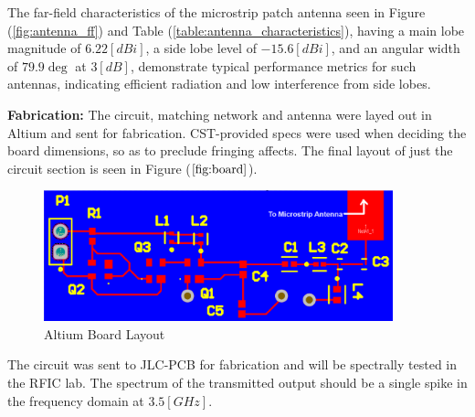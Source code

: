 The far-field characteristics of the microstrip patch antenna seen in Figure (\ref{fig:antenna_ff}) and Table (\ref{table:antenna_characteristics}), having a main lobe magnitude of \(6.22 [dBi]\), a side lobe level of \(-15.6 [dBi]\), and an angular width of \(79.9 \deg\) at \(3 [dB]\), demonstrate typical performance metrics for such antennas, indicating efficient radiation and low interference from side lobes.


\textbf{Fabrication:}
The circuit, matching network and antenna were layed out in Altium and sent for fabrication. CST-provided specs were used when deciding the board dimensions, so as to preclude fringing affects. The final layout of just the circuit section is seen in Figure (\(\ref{fig:board}\)).
\begin{figure}
    \centering
\includegraphics[width=0.9\textwidth]{images/layout/board.png}
    \caption{Altium Board Layout}
    \label{fig:board}
\end{figure}
The circuit was sent to JLC-PCB for fabrication and will be spectrally tested in the RFIC lab. The spectrum of the transmitted output should be a single spike in the frequency domain at \(3.5[GHz]\).